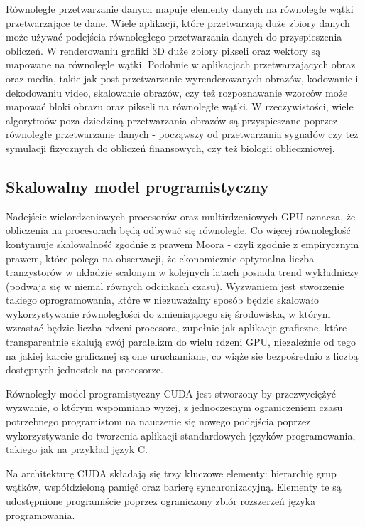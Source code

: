 Równoległe przetwarzanie danych mapuje elementy danych na równoległe wątki przetwarzające te dane. Wiele aplikacji, które przetwarzają duże zbiory danych może używać podejścia równoległego przetwarzania danych do przyspieszenia obliczeń. W renderowaniu grafiki 3D duże zbiory pikseli oraz wektory są mapowane na równoległe wątki. Podobnie w aplikacjach przetwarzających obraz oraz media, takie jak post-przetwarzanie wyrenderowanych obrazów, kodowanie i  dekodowaniu video, skalowanie obrazów, czy też rozpoznawanie wzorców może mapować bloki obrazu oraz pikseli na równoległe wątki. W rzeczywistości, wiele algorytmów poza dziedziną przetwarzania obrazów są przyspieszane poprzez równoległe przetwarzanie danych - począwszy od przetwarzania sygnałów czy też symulacji fizycznych do obliczeń finansowych, czy też biologii oblieczniowej.

\subsection{Skalowalny model programistyczny}
Nadejście wielordzeniowych procesorów oraz multirdzeniowych GPU oznacza, że obliczenia na procesorach będą odbywać się równolegle. Co więcej równoległość kontynuuje skalowalność zgodnie z prawem Moora - czyli zgodnie z empirycznym prawem, które polega na obserwacji, że ekonomicznie optymalna liczba tranzystorów w układzie scalonym w kolejnych latach posiada trend wykładniczy (podwaja się w niemal równych odcinkach czasu). Wyzwaniem jest stworzenie takiego oprogramowania, które w niezuważalny sposób będzie skalowało wykorzystywanie równoległości do zmieniającego się środowiska, w którym wzrastać będzie liczba rdzeni procesora, zupełnie jak aplikacje graficzne, które transparentnie skalują swój paralelizm do wielu rdzeni GPU, niezależnie od tego na jakiej karcie graficznej są one uruchamiane, co wiąże sie bezpośrednio z liczbą dostępnych jednostek na procesorze.

Równoległy model programistyczny CUDA jest stworzony by przezwyciężyć wyzwanie, o którym wspomniano wyżej, z jednoczesnym ograniczeniem czasu potrzebnego programistom na nauczenie się nowego podejścia poprzez wykorzystywanie do tworzenia aplikacji standardowych języków programowania, takiego jak na przykład język C.

Na architekturę CUDA składają się trzy kluczowe elementy: hierarchię grup wątków, współdzieloną pamięć oraz barierę synchronizacyjną. Elementy te są udostępnione programiście poprzez ograniczony zbiór rozszerzeń języka programowania.

